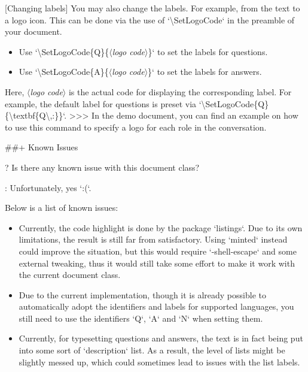 \documentclass[%
  use style = classical,
  scroll,
]{Q-and-A}
\newcommand{\meta}[1]{$\langle${\normalfont\itshape#1}$\rangle$}
\begin{document}
  [Changing labels]
  You may also change the labels. For example, from the text  to a logo icon. This can be done via the use of `\textbackslash SetLogoCode` in the preamble of your document.
  \begin{itemize}
    \item Use `\textbackslash SetLogoCode\{Q\}\{\meta{logo code}\}` to set the labels for questions.
    \item Use `\textbackslash SetLogoCode\{A\}\{\meta{logo code}\}` to set the labels for answers.
  \end{itemize}
  Here, \meta{logo code} is the actual code for displaying the corresponding label. For example, the default label for questions is preset via `\textbackslash SetLogoCode\{Q\}\{\textbackslash textbf\{Q\textbackslash,:\}\}`.
  >>> In the demo document, you can find an example on how to use this command to specify a logo for each role in the conversation.


##+ {Known Issues}

?
  Is there any known issue with this document class?

:
  Unfortunately, yes `:(`.

  Below is a list of known issues:

  \begin{itemize}
    \item Currently, the code highlight is done by the package `listings`. Due to its own limitations, the result is still far from satisfactory. Using `minted` instead could improve the situation, but this would require `-shell-escape` and some external tweaking, thus it would still take some effort to make it work with the current document class.
    \item Due to the current implementation, though it is already possible to automatically adopt the identifiers and labels for supported languages, you still need to use the identifiers `Q`, `A` and `N` when setting them.
    \item Currently, for typesetting questions and answers, the text is in fact being put into some sort of `description` list. As a result, the level of lists might be slightly messed up, which could sometimes lead to issues with the list labels.
  \end{itemize}
\end{document}
